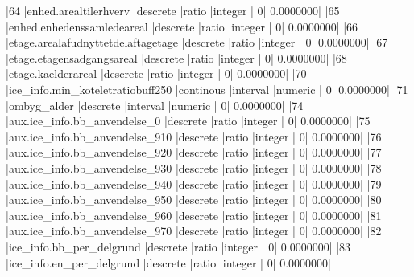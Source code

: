 \documentclass{report}
\begin{document}
\begin{Schunk}
\begin{Soutput}
|64  |enhed.arealtilerhverv                                         |descrete           |ratio          |integer         |              0|          0.0000000|
|65  |enhed.enhedenssamledeareal                                    |descrete           |ratio          |integer         |              0|          0.0000000|
|66  |etage.arealafudnyttetdelaftagetage                            |descrete           |ratio          |integer         |              0|          0.0000000|
|67  |etage.etagensadgangsareal                                     |descrete           |ratio          |integer         |              0|          0.0000000|
|68  |etage.kaelderareal                                            |descrete           |ratio          |integer         |              0|          0.0000000|
|70  |ice_info.min_koteletratiobuff250                              |continous          |interval       |numeric         |              0|          0.0000000|
|71  |ombyg_alder                                                   |descrete           |interval       |numeric         |              0|          0.0000000|
|74  |aux.ice_info.bb_anvendelse_0                                  |descrete           |ratio          |integer         |              0|          0.0000000|
|75  |aux.ice_info.bb_anvendelse_910                                |descrete           |ratio          |integer         |              0|          0.0000000|
|76  |aux.ice_info.bb_anvendelse_920                                |descrete           |ratio          |integer         |              0|          0.0000000|
|77  |aux.ice_info.bb_anvendelse_930                                |descrete           |ratio          |integer         |              0|          0.0000000|
|78  |aux.ice_info.bb_anvendelse_940                                |descrete           |ratio          |integer         |              0|          0.0000000|
|79  |aux.ice_info.bb_anvendelse_950                                |descrete           |ratio          |integer         |              0|          0.0000000|
|80  |aux.ice_info.bb_anvendelse_960                                |descrete           |ratio          |integer         |              0|          0.0000000|
|81  |aux.ice_info.bb_anvendelse_970                                |descrete           |ratio          |integer         |              0|          0.0000000|
|82  |ice_info.bb_per_delgrund                                      |descrete           |ratio          |integer         |              0|          0.0000000|
|83  |ice_info.en_per_delgrund                                      |descrete           |ratio          |integer         |              0|          0.0000000|

\end{Soutput}
\end{Schunk}
\end{document}
